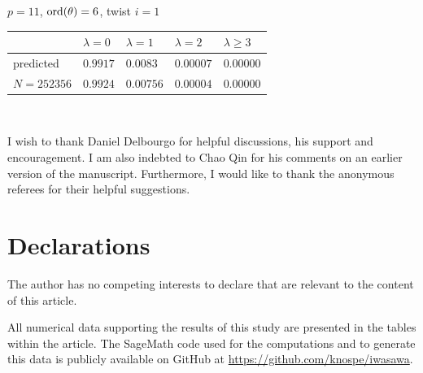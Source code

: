 \documentclass[pdflatex,sn-mathphys-num]{sn-jnl}%
\theoremstyle{plain}
\theoremstyle{definition}
\theoremstyle{remark}
\numberwithin{equation}{section}
\newcommand{\ord}{\text{\rm ord}}
\begin{document}
\noindent $p=11$, $\ord(\theta)=6$,   twist $i=1$\\
\begin{tabular}{|l|l|l|l|l|} \hline
 & $\lambda=0$ & $\lambda=1$ & $\lambda=2$ & $\lambda\geq 3$ \\ \hline
predicted & $0.9917$ & $0.0083$ & $0.00007$ & $0.00000$ \\ \hline
$N=252356$ & $0.9924$ & $0.00756$ & $0.00004$ & $0.00000$\\ \hline
\end{tabular}\\

\backmatter


I wish to thank Daniel Delbourgo for helpful discussions, his support and encouragement. I am also indebted to Chao Qin for his comments on an earlier version of the manuscript. Furthermore, I would like to thank the anonymous referees for their helpful suggestions.\\


\section*{Declarations}
 The author has no competing interests to declare that are relevant to the content of this article.

All numerical data supporting the results of this study are presented in the tables within the article. The SageMath code used for the computations and to generate this data is publicly available on GitHub at \url{https://github.com/knospe/iwasawa}. 


\end{document}
